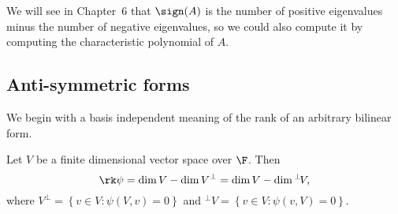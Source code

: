 \vspace{6pt}

\begin{remark}
	We will see in Chapter~6 that $\sign(A)$ is the number of positive eigenvalues minus the number of negative eigenvalues, so we could also compute it by computing the characteristic polynomial of $A$. %
\end{remark}


	\pagebreak

\subsection{Anti-symmetric forms} %
\label{sub:antisymmetric_forms}

We begin with a basis independent meaning of the rank of an arbitrary bilinear form.
\begin{proposition}
	Let $V$ be a finite dimensional vector space over $\F$. Then
	\begin{equation*}
		\rk\psi = \dim V - \dim V^\perp = \dim V - \dim {}^\perp\! V,
	\end{equation*}
	where $V^\perp = \left\{v\in V: \psi(V,v) = 0 \right\}$ and ${}^\perp V = \left\{v\in V:\psi(v,V) = 0\right\}$. %
\end{proposition}

